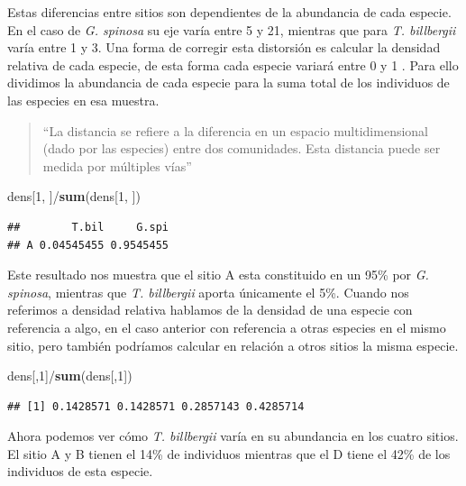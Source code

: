 \documentclass[]{book}
\newenvironment{Shaded}{\begin{snugshade}}{\end{snugshade}}
\newcommand{\KeywordTok}[1]{\textcolor[rgb]{0.13,0.29,0.53}{\textbf{{#1}}}}
\newcommand{\DecValTok}[1]{\textcolor[rgb]{0.00,0.00,0.81}{{#1}}}
\newcommand{\NormalTok}[1]{{#1}}
\begin{document}
Estas diferencias entre sitios son dependientes de la abundancia de cada
especie. En el caso de \emph{G. spinosa} su eje varía entre 5 y 21,
mientras que para \emph{T. billbergii} varía entre 1 y 3. Una forma de
corregir esta distorsión es calcular la densidad relativa de cada
especie, de esta forma cada especie variará entre 0 y 1
\citep{Stevens2009}. Para ello dividimos la abundancia de cada especie
para la suma total de los individuos de las especies en esa muestra.

\begin{quote}
``La distancia se refiere a la diferencia en un espacio multidimensional
(dado por las especies) entre dos comunidades. Esta distancia puede ser
medida por múltiples vías''
\end{quote}

\begin{Shaded}
\begin{Highlighting}[]
\NormalTok{dens[}\DecValTok{1}\NormalTok{, ]/}\KeywordTok{sum}\NormalTok{(dens[}\DecValTok{1}\NormalTok{, ])}
\end{Highlighting}
\end{Shaded}

\begin{verbatim}
##        T.bil     G.spi
## A 0.04545455 0.9545455
\end{verbatim}

Este resultado nos muestra que el sitio A esta constituido en un 95\%
por \emph{G. spinosa}, mientras que \emph{T. billbergii} aporta
únicamente el 5\%. Cuando nos referimos a densidad relativa hablamos de
la densidad de una especie con referencia a algo, en el caso anterior
con referencia a otras especies en el mismo sitio, pero también
podríamos calcular en relación a otros sitios la misma especie.

\begin{Shaded}
\begin{Highlighting}[]
\NormalTok{dens[,}\DecValTok{1}\NormalTok{]/}\KeywordTok{sum}\NormalTok{(dens[,}\DecValTok{1}\NormalTok{])}
\end{Highlighting}
\end{Shaded}

\begin{verbatim}
## [1] 0.1428571 0.1428571 0.2857143 0.4285714
\end{verbatim}

Ahora podemos ver cómo \emph{T. billbergii} varía en su abundancia en
los cuatro sitios. El sitio A y B tienen el 14\% de individuos mientras
que el D tiene el 42\% de los individuos de esta especie.
\end{document}
